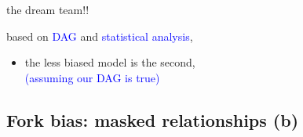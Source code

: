 %
%
\begin{lhframe}[rhgraphic={\texttt{[image: fork2\_reg2.png]}}]
	{the dream team!!}
	
	based on \textcolor{blue}{DAG} and \textcolor{blue}{statistical analysis},
	\begin{itemize}
		\item the less biased model is the second, \\
		{\small \textcolor{blue}{(assuming our DAG is true)} }
	\end{itemize}
\end{lhframe}
%
%
\subsection{Fork bias: masked relationships (b)}
%
%
\begin{frame}[t, negative]
	\subsectionpage
\end{frame}
%
%
